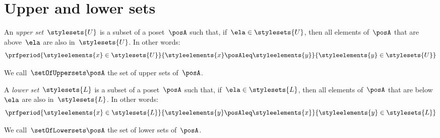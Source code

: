 \section{Upper and lower sets}
\label{sec:UpperLowerSets}


\begin{definition}
	\label{def:upperset}
	An \emph{upper set}~$\stylesets{U}$ is a subset of a poset~$\posA$ such that, if~$\ela \in \stylesets{U}$, then all elements of~$\posA$ that are above~$\ela$ are also in~$\stylesets{U}$.
	In other words:
	\begin{equation}
		\prfperiod{\styleelements{x}\in \stylesets{U}}{\styleelements{x}\posAleq \styleelements{y}}{\styleelements{y}\in \stylesets{U}}
	\end{equation}
\end{definition}
We call~$\setOfUppersets \posA$ the set of upper sets of~$\posA$.

\begin{definition}
	\label{def:lowerset}
	A \emph{lower set}~$\stylesets{L}$ is a subset of a poset~$\posA$ such that, if~$\ela \in \stylesets{L}$, then all elements of~$\posA$ that are below~$\ela$ are also in~$\stylesets{L}$.
	In other words:
	\begin{equation}
		\prfperiod{\styleelements{x}\in \stylesets{L}}{\styleelements{y}\posAleq \styleelements{x}}{\styleelements{y}\in \stylesets{L}}
	\end{equation}
\end{definition}
We call~$\setOfLowersets\posA$ the set of lower sets of~$\posA$.
%


